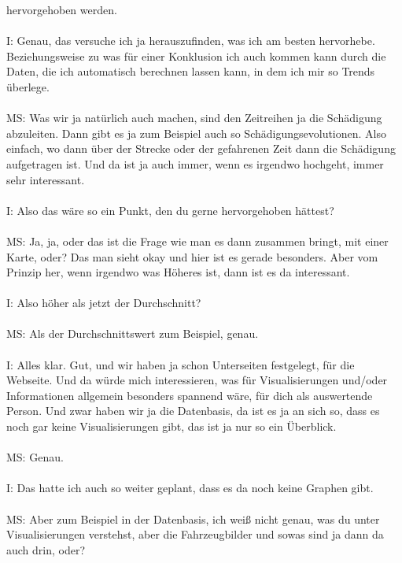 \begin{linenumbers}
hervorgehoben werden. \\\\
I: Genau, das versuche ich ja herauszufinden, was ich am besten hervorhebe. Beziehungsweise zu was für einer Konklusion ich auch kommen kann durch die Daten, die ich automatisch berechnen lassen kann, in dem ich mir so Trends überlege. \\\\
MS: Was wir ja natürlich auch machen, sind den Zeitreihen ja die Schädigung abzuleiten. Dann gibt es ja zum Beispiel auch so Schädigungsevolutionen. Also einfach, wo dann über der Strecke oder der gefahrenen Zeit dann die Schädigung aufgetragen ist. Und da ist ja auch immer, wenn es irgendwo hochgeht, immer sehr interessant.\\\\
I: Also das wäre so ein Punkt, den du gerne hervorgehoben hättest?\\\\
MS: Ja, ja, oder das ist die Frage wie man es dann zusammen bringt, mit einer Karte, oder? Das man sieht okay und hier ist es gerade besonders. Aber vom Prinzip her, wenn irgendwo was Höheres ist, dann ist es da interessant. \\\\
I: Also höher als jetzt der Durchschnitt?\\\\
MS: Als der Durchschnittswert zum Beispiel, genau. \\\\
I: Alles klar. Gut, und wir haben ja schon Unterseiten festgelegt, für die Webseite. Und da würde mich interessieren, was für Visualisierungen und/oder Informationen allgemein besonders spannend  wäre, für dich als auswertende Person. Und zwar haben wir ja die Datenbasis, da ist es ja an sich so, dass es noch gar keine Visualisierungen gibt, das ist ja nur so ein Überblick.\\\\
MS: Genau.\\\\
I: Das hatte ich auch so weiter geplant, dass es da noch keine Graphen gibt.\\\\
MS: Aber zum Beispiel in der Datenbasis, ich weiß nicht genau, was du unter Visualisierungen verstehst, aber die Fahrzeugbilder und sowas sind ja dann da auch drin, oder?\\\\

\end{linenumbers}
